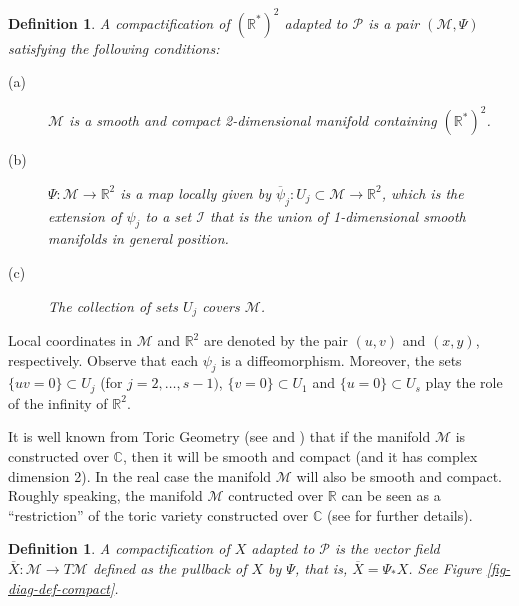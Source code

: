 \documentclass[12pt]{amsart}
\newtheorem{definition}[theorem]{Definition}
\begin{document}
\begin{definition}
A \emph{compactification of $(\mathbb{R}^{*})^{2}$ adapted to $\mathcal{P}$} is a pair $(\mathcal{M},\Psi)$ satisfying the following conditions:
\begin{description}
    \item[(a)] $\mathcal{M}$ is a smooth and compact 2-dimensional manifold containing $(\mathbb{R}^{*})^{2}$.
    \item[(b)] $\Psi:\mathcal{M}\rightarrow\mathbb{R}^{2}$ is a map locally given by $\overline{\psi}_{j}:U_{j}\subset\mathcal{M}\rightarrow\mathbb{R}^{2}$, which is the extension of $\psi_{j}$ to a set $\mathcal{I}$ that is the union of 1-dimensional smooth manifolds in general position.
    \item[(c)] The collection of sets $U_{j}$ covers $\mathcal{M}$.
\end{description}
\end{definition}

Local coordinates in $\mathcal{M}$ and $\mathbb{R}^{2}$ are denoted by the pair $(u,v)$ and $(x,y)$, respectively. Observe that each $\psi_{j}$ is a diffeomorphism. Moreover, the sets $\{uv = 0\}\subset U_{j}$ (for $j = 2,\dots,s-1)$, $\{v = 0\}\subset U_{1}$ and $\{u = 0\}\subset U_{s}$ play the role of the infinity of $\mathbb{R}^{2}$.

It is well known from Toric Geometry (see \cite[Section 3.4]{Brasselet} and \cite[Section 3.1]{CoxLittleSchenck}) that if the manifold $\mathcal{M}$ is constructed over $\mathbb{C}$, then it will be smooth and compact (and it has complex dimension 2). In the real case the manifold $\mathcal{M}$ will also be smooth and compact. Roughly speaking, the manifold $\mathcal{M}$ contructed over $\mathbb{R}$ can be seen as a ``restriction'' of the toric variety constructed over $\mathbb{C}$ (see \cite{Sottile} for further details).


\begin{definition}\label{def-compact}
A \emph{compactification of $X$ adapted to $\mathcal{P}$} is the vector field $\overline{X}:\mathcal{M}\rightarrow T\mathcal{M}$ defined as the pullback of $X$ by $\Psi$, that is, $\overline{X} = \Psi_{*}X$. See Figure \ref{fig-diag-def-compact}.
\end{definition}
\end{document}
